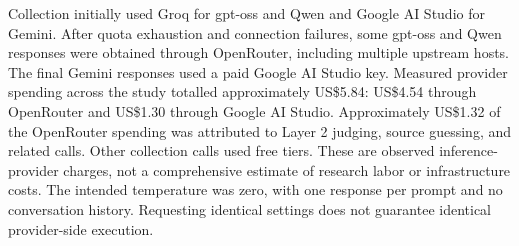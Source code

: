 \documentclass[11pt]{article}
\begin{document}
Collection initially used Groq for gpt-oss and Qwen and Google AI Studio for Gemini. After quota exhaustion and connection failures, some gpt-oss and Qwen responses were obtained through OpenRouter, including multiple upstream hosts. The final Gemini responses used a paid Google AI Studio key. Measured provider spending across the study totalled approximately US\$5.84: US\$4.54 through OpenRouter and US\$1.30 through Google AI Studio. Approximately US\$1.32 of the OpenRouter spending was attributed to Layer 2 judging, source guessing, and related calls. Other collection calls used free tiers. These are observed inference-provider charges, not a comprehensive estimate of research labor or infrastructure costs. The intended temperature was zero, with one response per prompt and no conversation history. Requesting identical settings does not guarantee identical provider-side execution.
\end{document}
